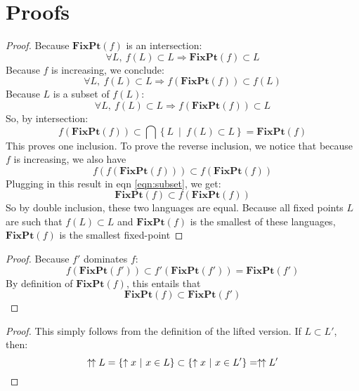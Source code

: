 \section*{Proofs} 

\begin{proof}
Because $\mathbf{FixPt}(f)$ is an intersection:
\begin{equation}
\forall L,\ f(L)\subset L \Rightarrow \mathbf{FixPt}(f) \subset L \label{eqn:subset}
\end{equation}
Because $f$ is increasing, we conclude:
$$\forall L,\ f(L)\subset L \Rightarrow f\left(\mathbf{FixPt}(f)\right) \subset f(L)$$
Because $L$ is a subset of $f(L)$:
$$\forall L,\ f(L)\subset L \Rightarrow f\left(\mathbf{FixPt}(f)\right) \subset L$$
So, by intersection:
$$f\left(\mathbf{FixPt}(f)\right) \subset \bigcap \left\lbrace L\ \middle|\ f(L)\subset L\right\rbrace = \mathbf{FixPt}(f)$$
This proves one inclusion. To prove the reverse inclusion, we notice that because $f$ is increasing, we also have
$$f(f(\mathbf{FixPt}(f)))\subset f(\mathbf{FixPt}(f))$$
Plugging in this result in eqn \ref{eqn:subset}, we get:
 $$\mathbf{FixPt}(f) \subset f(\mathbf{FixPt}(f))$$
 So by double inclusion, these two languages are equal. Because all fixed points $L$ are such that $f(L)\subset L$ and $\mathbf{FixPt}(f)$ is the smallest of these languages, $\mathbf{FixPt}(f)$ is the smallest fixed-point
\end{proof}


\begin{proof}
Because $f'$ dominates $f$:
$$f(\mathbf{FixPt}(f'))\subset f'(\mathbf{FixPt}(f')) = \mathbf{FixPt}(f')$$
By definition of $\mathbf{FixPt}(f)$, this entails that
$$\mathbf{FixPt}(f)\subset \mathbf{FixPt}(f')$$
\end{proof}


\begin{proof}
This simply follows from the definition of the lifted version. If $L\subset L'$, then:
$$\uparrow\hspace{-1pt}\uparrow L = \left\lbrace \uparrow x\ \middle|\ x\in L\right\rbrace \subset   \left\lbrace \uparrow x\ \middle|\ x\in L'\right\rbrace = \uparrow\hspace{-1pt}\uparrow L'$$
\end{proof}





